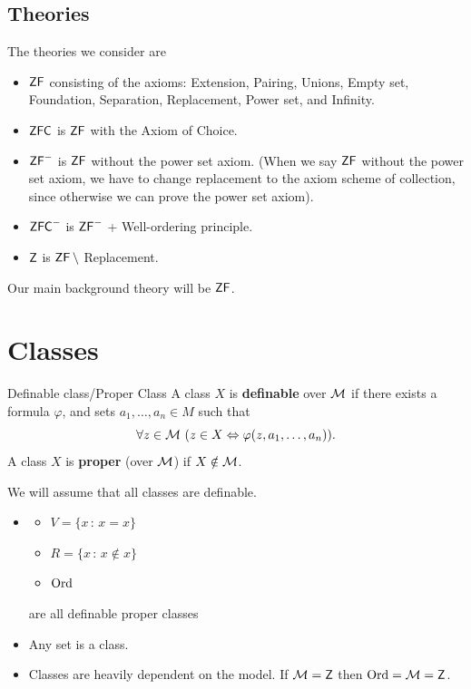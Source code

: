\documentclass{article}
\begin{document}
\subsection{Theories}
The theories we consider are \begin{itemize}
    \item $\mathsf{ZF}$ consisting of the axioms: Extension, Pairing, Unions, Empty set, Foundation, Separation, Replacement, Power set, and Infinity.
    \item $\mathsf{ZFC}$ is $\mathsf{ZF}$ with the Axiom of Choice.
    \item $\mathsf{ZF}^{-}$ is $\mathsf{ZF}$ without the power set axiom. (When we say $\mathsf{ZF}$ without the power set axiom, we have to change replacement to the axiom scheme of collection, since otherwise we can prove the power set axiom).
    \item $\mathsf{ZFC}^{-}$ is $\mathsf{ZF}^{-}$ + Well-ordering principle.
    \item $\mathsf{Z}$ is $\mathsf{ZF} \, \setminus$ Replacement.
\end{itemize}
\begin{remark*}
    Our main background theory will be $\mathsf{ZF}$.
\end{remark*}
\section{Classes}
\begin{fancydefine*}{Definable class/Proper Class}
    A class $X$ is \textbf{definable} over $\mathcal{M}$ if there exists a formula $\varphi$, and sets $a_{1}, \dots, a_{n} \in M$ such that \[ \forall z \in \mathcal{M} \,\, ( z \in X \Leftrightarrow \varphi(z, a_{1}, \dots, a_{n})).\]
    A class $X$ is \textbf{proper} (over $\mathcal{M}$) if $X \notin \mathcal{M}$.
\end{fancydefine*}
We will assume that all classes are definable.
\begin{ex*}
    \begin{itemize}\hspace{0.1cm}
        \item \begin{itemize}
                  \item $V = \{x \, : \, x = x\}$
                  \item $R = \{ x \, : \, x \notin x\}$
                  \item $\operatorname{Ord}$
              \end{itemize}
              are all definable proper classes
        \item Any set is a class.
        \item Classes are heavily dependent on the model. If $\mathcal{M} = \mathsf{Z}$ then $\operatorname{Ord} = \mathcal{M} = \mathsf{Z}$.
    \end{itemize}
\end{ex*}
\end{document}
